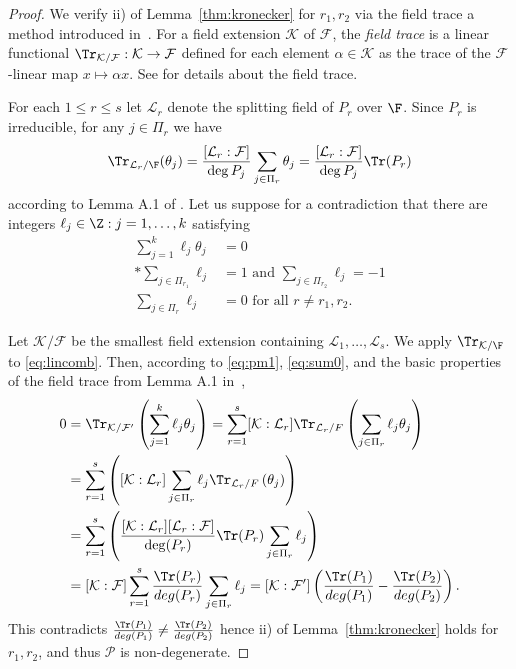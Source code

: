 \begin{proof}
We verify ii) of Lemma~\ref{thm:kronecker} for $r_1,r_2$ via the field trace a method introduced in~\cite{invol}. For a field extension $\mathcal{K}$ of $\mathcal{F}$, the \emph{field trace} is a linear functional $\Tr_{\mathcal K/\mathcal F}: \mathcal K \rightarrow \mathcal F$  defined for each element  $\alpha \in \mathcal{K}$ as the trace of the $\mathcal{F}$-linear map $x\mapsto \alpha x$. See \cite{lang_book} for details about the field trace.

For each $1\leq r \leq s$ let  $\mathcal{L}_r$ denote the splitting field of $P_r$ over $\F$. Since $P_r$ is irreducible, for any $j \in \Pi_r$ we have 
\[ \Tr_{\mathcal{L}_r / \F}(\theta_j) = \frac{[\mathcal L_r:\mathcal{F}]}{\deg P_j}\sum_{j \in \Pi_r} \theta_j =  \frac{[\mathcal L_r:\mathcal{F}]}{\deg P_j} \Tr(P_r)\]
according to Lemma A.1 of \cite{eisenberg2019pretty}.
Let us suppose for a contradiction that there are integers $\ell_j \in \Z : j=1,\dots, k$ satisfying 
\begin{align}
\sum_{j=1}^k\ell_j \theta_j &= 0 \label{eq:lincomb}\\*
\sum_{j \in \Pi_{r_1}} \ell_j &= 1 \text{ and } \sum_{j \in \Pi_{r_2}} \ell_j = -1\label{eq:pm1}\\
\sum_{j \in \Pi_r} \ell_j &=0 \text{ for all } r \neq r_1, r_2. \label{eq:sum0}
\end{align}

Let $\mathcal K/\mathcal F$ be the smallest field extension containing $\mathcal L_1,\ldots,\mathcal L_s$. We apply $\Tr_{\mathcal{K}/\F}$ to \eqref{eq:lincomb}. Then, according to \eqref{eq:pm1},  \eqref{eq:sum0}, and the basic properties of the field trace from Lemma A.1 in~\cite{eisenberg2019pretty},
\begin{align*}
0&=\Tr_{\mathcal K/\mathcal F'}\left( \sum_{j=1}^k \ell_j \theta_j \right) = \sum_{r=1}^s[\mathcal K:\mathcal L_r]\Tr_{\mathcal L_r/F}\left(\sum_{j \in \Pi_r} \ell_j \theta_j \right)\\
&=\sum_{r=1}^s\left([\mathcal K:\mathcal L_r] \sum_{j \in \Pi_r} \ell_j \Tr_{\mathcal L_r/F}\left(\theta_j \right)\right)\\ 
&=\sum_{r=1}^s\left(\frac{[\mathcal K:\mathcal L_r][\mathcal L_r:\mathcal F]}{\deg(P_r)}\Tr(P_r)\sum_{j \in \Pi_r} \ell_j \right)\\
&=[\mathcal K:\mathcal F]\sum_{r=1}^s\frac{\Tr(P_r)}{deg(P_r)}\sum_{j \in \Pi_r} \ell_j 
=[\mathcal K:\mathcal F']\left(\frac{\Tr(P_1)}{deg(P_1)}-\frac{\Tr(P_2)}{deg(P_2)}\right).
\end{align*}
This contradicts $\frac{\Tr(P_1)}{deg(P_1)} \neq \frac{\Tr(P_2)}{deg(P_2)}$ hence ii) of Lemma~\ref{thm:kronecker} holds for $r_1,r_2$, and thus $\mathcal{P}$ is non-degenerate.

\end{proof}

